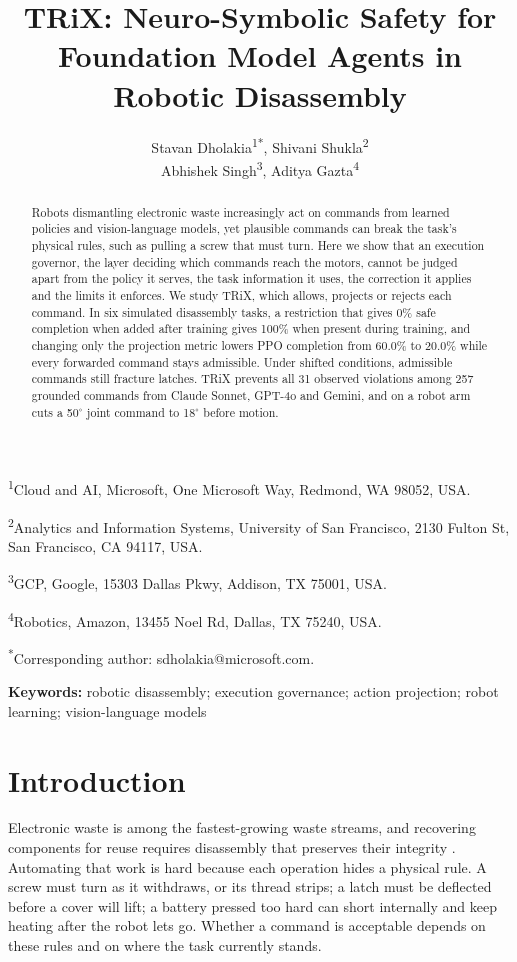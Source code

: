 \documentclass[12pt]{article}
\title{TRiX: Neuro-Symbolic Safety for Foundation Model Agents in Robotic Disassembly}
\author{Stavan Dholakia\textsuperscript{1*}, Shivani Shukla\textsuperscript{2}\\
Abhishek Singh\textsuperscript{3}, Aditya Gazta\textsuperscript{4}}
\date{}
\begin{document}
\begingroup
\setlength{\parskip}{0pt}
\maketitle
\endgroup

{\footnotesize
\noindent\textsuperscript{1}Cloud and AI, Microsoft, One Microsoft Way, Redmond, WA 98052, USA.\par
\noindent\textsuperscript{2}Analytics and Information Systems, University of San Francisco, 2130 Fulton St, San Francisco, CA 94117, USA.\par
\noindent\textsuperscript{3}GCP, Google, 15303 Dallas Pkwy, Addison, TX 75001, USA.\par
\noindent\textsuperscript{4}Robotics, Amazon, 13455 Noel Rd, Dallas, TX 75240, USA.\par
\noindent\textsuperscript{*}Corresponding author: sdholakia@microsoft.com.\par
}
\begin{abstract}
\noindent Robots dismantling electronic waste increasingly act on commands from
learned policies and vision-language models, yet plausible commands can break
the task's physical rules, such as pulling a screw that must turn.
Here we show that an execution governor, the layer deciding which commands
reach the motors, cannot be judged apart from the policy it serves, the task
information it uses, the correction it applies and the limits it enforces. We
study TRiX, which allows, projects or rejects each command. In six simulated disassembly tasks, a restriction that gives 0\% safe completion when added after training gives 100\% when present during training, and changing only the
projection metric lowers PPO completion from 60.0\% to 20.0\% while every forwarded
command stays admissible. Under shifted conditions, admissible commands still
fracture latches. TRiX prevents all 31 observed violations among 257 grounded commands from
Claude Sonnet, GPT-4o and Gemini, and on a robot arm cuts a 50$^\circ$ joint
command to 18$^\circ$ before motion.
\end{abstract}

\noindent\textbf{Keywords:} robotic disassembly; execution governance; action
projection; robot learning; vision-language models
\linenumbers

\section{Introduction}
\label{sec:intro}
Electronic waste is among the fastest-growing waste streams, and recovering
components for reuse requires disassembly that preserves their integrity
\cite{ref1,ref2,ref3,ref4,ref5,ref6}. Automating that work is hard
because each operation hides a physical rule. A screw must turn as it
withdraws, or its thread strips; a latch must be deflected before a cover will
lift; a battery pressed too hard can short internally and keep heating after
the robot lets go. Whether a command is acceptable depends on these rules and
on where the task currently stands.
\end{document}
